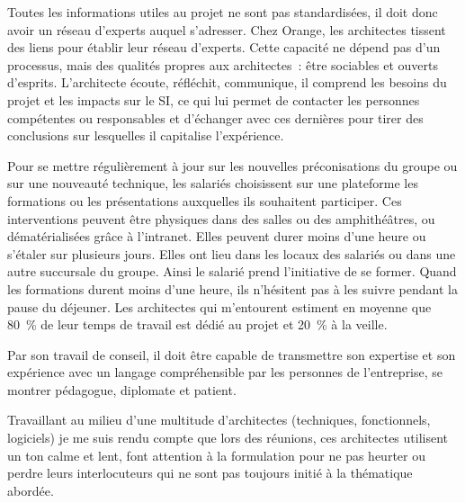     Toutes les informations utiles au projet ne sont pas standardisées, il doit donc avoir un réseau d’experts auquel s’adresser.
    Chez Orange, les architectes tissent des liens pour établir leur réseau d’experts.
    Cette capacité ne dépend pas d’un processus, mais des qualités propres aux architectes : être sociables et ouverts d’esprits.
    L’architecte écoute, réfléchit, communique, il comprend les besoins du projet et les impacts sur le SI, ce qui lui permet de contacter les personnes compétentes ou responsables et d’échanger avec ces dernières pour tirer des conclusions sur lesquelles il capitalise l’expérience.

    Pour se mettre régulièrement à jour sur les nouvelles préconisations du groupe ou sur une nouveauté technique, les salariés choisissent sur une plateforme les formations ou les présentations auxquelles ils souhaitent participer.
    Ces interventions peuvent être physiques dans des salles ou des amphithéâtres, ou dématérialisées grâce à l’intranet.
    Elles peuvent durer moins d’une heure ou s’étaler sur plusieurs jours.
    Elles ont lieu dans les locaux des salariés ou dans une autre succursale du groupe.
    Ainsi le salarié prend l’initiative de se former.
    Quand les formations durent moins d’une heure, ils n’hésitent pas à les suivre pendant la pause du déjeuner.
    Les architectes qui m’entourent estiment en moyenne que 80 \% de leur temps de travail est dédié au projet et 20 \% à la veille.

    Par son travail de conseil, il doit être capable de transmettre son expertise et son expérience avec un langage compréhensible par les personnes de l’entreprise, se montrer pédagogue, diplomate et patient.

    Travaillant au milieu d’une multitude d’architectes (techniques, fonctionnels, logiciels) je me suis rendu compte que lors des réunions, ces architectes utilisent un ton calme et lent, font attention à la formulation pour ne pas heurter ou perdre leurs interlocuteurs qui ne sont pas toujours initié à la thématique abordée.
